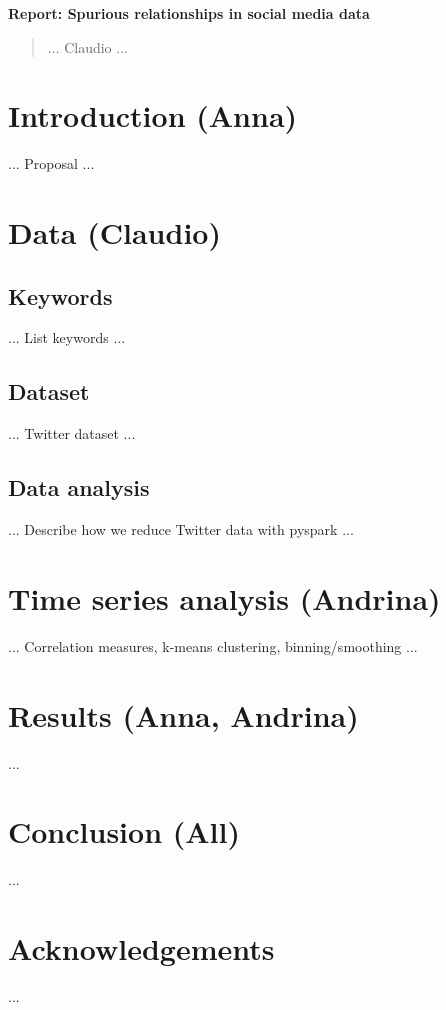 \documentclass[12pt, a4paper]{article}
\begin{document}
\textbf{Report: Spurious relationships in social media data}

\begin{abstract}
... Claudio ...
\end{abstract}


\vspace{0.2in}

\section{Introduction (Anna)}
... Proposal ...


\section{Data (Claudio)}
\subsection{Keywords}
... List keywords ...

\subsection{Dataset}
... Twitter dataset ...

\subsection{Data analysis}
... Describe how we reduce Twitter data with pyspark ...


\section{Time series analysis (Andrina)}
... Correlation measures, k-means clustering, binning/smoothing ...


\section{Results (Anna, Andrina)}
...


\section{Conclusion (All)}
...


\section{Acknowledgements}
...
\end{document}
